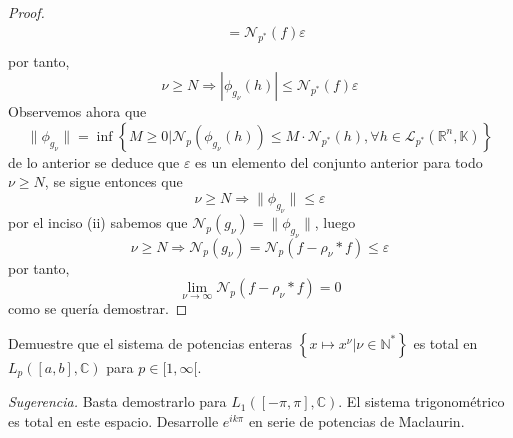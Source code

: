 \documentclass[12pt]{report}
\newcounter{it}
\theoremstyle{largebreak}
\newcommand\abs[1]{\ensuremath{\left|#1\right|}}
\newcommand{\N}[2]{\ensuremath{\mathcal{N}_{#1}\left(#2\right)}}
\newcommand{\norm}[1]{\ensuremath{\|#1\|}}
\begin{document}
\begin{proof}
\begin{equation*}
\begin{split}
                &=\N{p^*}{f}\varepsilon\\
            \end{split}
        \end{equation*}
        por tanto,
        \begin{equation*}
            \nu\geq N\Rightarrow\abs{\phi_{ g_\nu}(h)}\leq\N{p^*}{f}\varepsilon
        \end{equation*}
        Observemos ahora que
        \begin{equation*}
            \norm{\phi_{ g_\nu}}=\inf\left\{M\geq0\Big|\N{p}{\phi_{ g_\nu}(h)}\leq M\cdot\N{p^*}{h},\forall h\in\mathcal{L}_{ p^*}(\mathbb{R}^n,\mathbb{K}) \right\}
        \end{equation*}
        de lo anterior se deduce que $\varepsilon$ es un elemento del conjunto anterior para todo $\nu\geq N$, se sigue entonces que
        \begin{equation*}
            \nu\geq N\Rightarrow\norm{\phi_{g_\nu}}\leq\varepsilon
        \end{equation*}
        por el inciso (ii) sabemos que $\N{p}{g_\nu}=\norm{\phi_{g_\nu}}$, luego
        \begin{equation*}
            \nu\geq N\Rightarrow\N{p}{g_\nu}=\N{p}{f-\rho_\nu*f}\leq\varepsilon
        \end{equation*}
        por tanto,
        \begin{equation*}
            \lim_{ \nu\rightarrow\infty}\N{p}{f-\rho_\nu*f}=0
        \end{equation*}
        como se quería demostrar.
    \end{proof}

    \begin{excer}
        Demuestre que el sistema de potencias enteras $\left\{x\mapsto x^\nu\Big|\nu\in\mathbb{N}^* \right\}$ es total en $L_p([a,b],\mathbb{C})$ para $p\in[1,\infty[$.

        \textit{Sugerencia.} Basta demostrarlo para $L_1([-\pi,\pi],\mathbb{C})$. El sistema trigonométrico es total en este espacio. Desarrolle $e^{ik\pi}$ en serie de potencias de Maclaurin.
    \end{excer}
\end{document}
